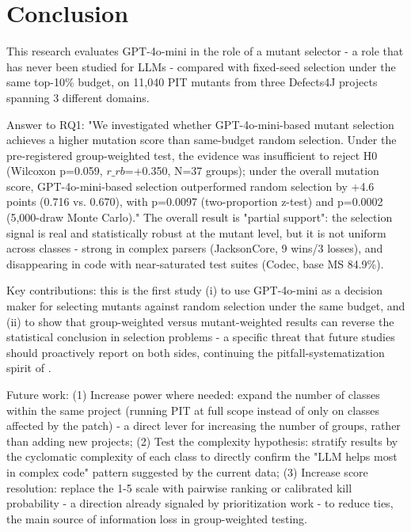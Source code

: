\section{Conclusion}
This research evaluates GPT-4o-mini in the role of a mutant selector - a role that has never been studied for LLMs - compared with fixed-seed selection under the same top-10\% budget, on 11,040 PIT mutants \cite{co}
from three Defects4J projects spanning 3 different domains.

Answer to RQ1: "We investigated whether GPT-4o-mini-based mutant selection achieves a higher mutation score than same-budget random selection. Under the pre-registered group-weighted test, the evidence was insufficient to reject H0 (Wilcoxon p=0.059, $r\_rb$=+0.350, N=37 groups); under the overall mutation score, GPT-4o-mini-based selection outperformed random selection by +4.6 points (0.716 vs. 0.670), with p=0.0097 (two-proportion z-test) and p=0.0002 (5,000-draw Monte Carlo)." The overall result is "partial support": the selection signal is real and statistically robust at the mutant level, but it is not uniform across classes - strong in complex parsers (JacksonCore, 9 wins/3 losses), and disappearing in code with near-saturated test suites (Codec, base MS 84.9\%).

Key contributions: this is the first study (i) to use GPT-4o-mini as a decision maker for selecting mutants against random selection under the same budget, and (ii) to show that group-weighted versus mutant-weighted results can reverse the statistical conclusion in selection problems - a specific threat that future studies should proactively report on both sides, continuing the pitfall-systematization spirit of \cite{delgadorerez2026pitfalls}.

Future work: (1) Increase power where needed: expand the number of classes within the same project (running PIT at full scope instead of only on classes affected by the patch) - a direct lever for increasing the number of groups, rather than adding new projects; (2) Test the complexity hypothesis: stratify results by the cyclomatic complexity of each class to directly confirm the "LLM helps most in complex code" pattern suggested by the current data; (3) Increase score resolution: replace the 1-5 scale with pairwise ranking or calibrated kill probability - a direction already signaled by prioritization work \cite{bouafif2025primg} - to reduce ties, the main source of information loss in group-weighted testing.